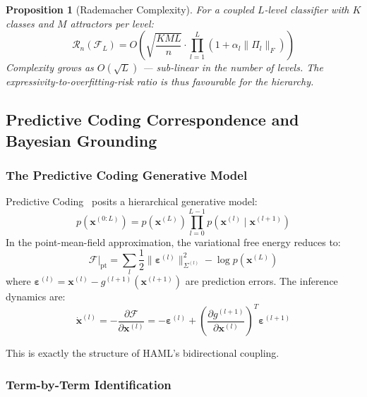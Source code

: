 \documentclass[11pt,a4paper]{article}
\newtheorem{proposition}[theorem]{Proposition}
\begin{document}
\begin{proposition}[Rademacher Complexity]
For a coupled $L$-level classifier with $K$ classes and $M$ attractors per level:
\begin{equation}
  \mathcal{R}_n(\mathcal{F}_L) = O\!\left(\sqrt{\frac{KML}{n}}
    \cdot \prod_{l=1}^{L}(1 + \alpha_l\|\Pi_l\|_F)\right)
\end{equation}
Complexity grows as $O(\sqrt{L})$ --- \emph{sub-linear} in the number of levels.  The
expressivity-to-overfitting-risk ratio is thus favourable for the hierarchy.
\label{prop:rademacher}
\end{proposition}

\subsection{Predictive Coding Correspondence and Bayesian Grounding}
\label{sec:theory:bayes}

\subsubsection{The Predictive Coding Generative Model}

Predictive Coding~\cite{rao1999predictive,friston2005theory} posits a hierarchical generative model:
\begin{equation}
  p(\mathbf{x}^{(0:L)}) = p(\mathbf{x}^{(L)}) \prod_{l=0}^{L-1}
    p(\mathbf{x}^{(l)} \mid \mathbf{x}^{(l+1)})
\end{equation}
In the point-mean-field approximation, the variational free energy reduces to:
\begin{equation}
  \mathcal{F}\big|_{\mathrm{pt}} =
    \sum_l \frac{1}{2}\|\boldsymbol{\varepsilon}^{(l)}\|^2_{\Sigma^{(l)}}
    - \log p(\mathbf{x}^{(L)})
\end{equation}
where $\boldsymbol{\varepsilon}^{(l)} = \mathbf{x}^{(l)} - g^{(l+1)}(\mathbf{x}^{(l+1)})$ are
prediction errors.  The inference dynamics are:
\begin{equation}
  \dot{\mathbf{x}}^{(l)} = -\frac{\partial \mathcal{F}}{\partial \mathbf{x}^{(l)}}
    = -\boldsymbol{\varepsilon}^{(l)}
    + \left(\frac{\partial g^{(l+1)}}{\partial \mathbf{x}^{(l)}}\right)^T
      \boldsymbol{\varepsilon}^{(l+1)}
\end{equation}

This is exactly the structure of HAML's bidirectional coupling.

\subsubsection{Term-by-Term Identification}
\end{document}
